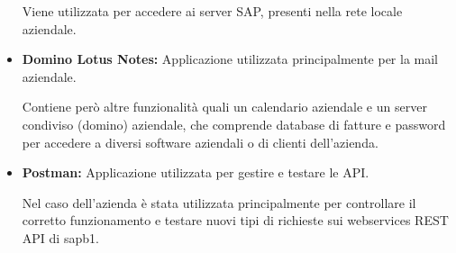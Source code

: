 \begin{itemize}
	Viene utilizzata per accedere ai server SAP, presenti nella rete locale aziendale.
	\item {\textbf{Domino Lotus Notes:}} Applicazione utilizzata principalmente per la mail aziendale.
	
	Contiene però altre funzionalità quali un calendario aziendale e un server condiviso (domino) aziendale, che comprende database di fatture e password per accedere a diversi software aziendali o di clienti dell'azienda.
    \item {\textbf{Postman:}} Applicazione utilizzata per gestire e testare le API.
    
    Nel caso dell'azienda è stata utilizzata principalmente per controllare il corretto funzionamento e testare nuovi tipi di richieste sui webservices REST API di \gls{sapb1}.
\end{itemize} 
